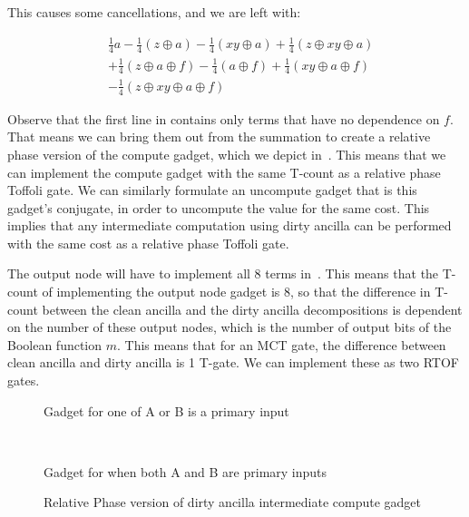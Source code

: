 This causes some cancellations, and we are left with:

\begin{equation}
  \label{eq-toff-simp}
  \begin{aligned}
    &\frac{1}{4}a - \frac{1}{4}(z \oplus a) - \frac{1}{4}(xy \oplus a) + \frac{1}{4}(z \oplus xy \oplus a)  \\
    &+ \frac{1}{4}(z \oplus a \oplus f) - \frac{1}{4}(a \oplus f) + \frac{1}{4}(xy \oplus a \oplus f) \\
    &- \frac{1}{4}(z \oplus xy \oplus a \oplus f)
  \end{aligned}
\end{equation}

Observe that the first line in contains only terms that have no dependence on $f$.
That means we can bring them out from the summation to create a relative phase version of the compute
gadget, which we depict in~. This means that we can implement the compute
gadget with the same T-count as a relative phase Toffoli gate. We can similarly formulate an uncompute
gadget that is this gadget's conjugate, in order to uncompute the value for the same cost. This implies
that any intermediate computation using dirty ancilla can be performed with the same cost as a relative
phase Toffoli gate. 

The output node will have to implement all 8 terms in~. This means that the T-count of
implementing the output node gadget is 8, so that the difference in T-count between the clean ancilla and
the dirty ancilla decompositions is dependent on the number of these output nodes, which is the number of
output bits of the Boolean function $m$. This means that for an MCT gate, the difference between clean
ancilla and dirty ancilla is 1 T-gate. We can implement these as two RTOF gates.
\begin{figure}
  \scalebox{0.9} {
    
  }
  \caption{Gadget for one of A or B is a primary input}
  \label{fig-prop-and}
\end{figure}
\begin{figure}
  \scalebox{1.0} {
    
  }\\\hline
  \caption{Gadget for when both A and B are primary inputs}
  \label{fig-prop-rtof}
\end{figure}

\begin{figure}
  \scalebox{0.6} {
    
  }
  \caption{Relative Phase version of dirty ancilla intermediate compute gadget}
  \label{fig-dirty-gadget-rp}
\end{figure}

